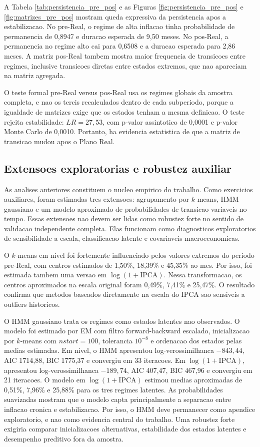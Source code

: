 A Tabela \ref{tab:persistencia_pre_pos} e as Figuras \ref{fig:persistencia_pre_pos} e \ref{fig:matrizes_pre_pos} mostram queda expressiva da persistencia apos a estabilizacao. No pre-Real, o regime de alta inflacao tinha probabilidade de permanencia de 0,8947 e duracao esperada de 9,50 meses. No pos-Real, a permanencia no regime alto cai para 0,6508 e a duracao esperada para 2,86 meses. A matriz pos-Real tambem mostra maior frequencia de transicoes entre regimes, inclusive transicoes diretas entre estados extremos, que nao apareciam na matriz agregada.

O teste formal pre-Real versus pos-Real usa os regimes globais da amostra completa, e nao os tercis recalculados dentro de cada subperiodo, porque a igualdade de matrizes exige que os estados tenham a mesma definicao. O teste rejeita estabilidade: \(LR=27,53\), com p-valor assintotico de 0,0001 e p-valor Monte Carlo de 0,0010. Portanto, ha evidencia estatistica de que a matriz de transicao mudou apos o Plano Real.

\subsection{Extensoes exploratorias e robustez auxiliar}

As analises anteriores constituem o nucleo empirico do trabalho. Como exercicios auxiliares, foram estimadas tres extensoes: agrupamento por \(k\)-means, HMM gaussiano e um modelo aproximado de probabilidades de transicao variaveis no tempo. Essas extensoes nao devem ser lidas como robustez forte no sentido de validacao independente completa. Elas funcionam como diagnosticos exploratorios de sensibilidade a escala, classificacao latente e covariaveis macroeconomicas.

O \(k\)-means em nivel foi fortemente influenciado pelos valores extremos do periodo pre-Real, com centros estimados de 1,50\%, 18,39\% e 45,35\% ao mes. Por isso, foi estimada tambem uma versao em \(\log(1+\text{IPCA})\). Nessa transformacao, os centros aproximados na escala original foram 0,49\%, 7,41\% e 25,47\%. O resultado confirma que metodos baseados diretamente na escala do IPCA sao sensiveis a outliers historicos.

O HMM gaussiano trata os regimes como estados latentes nao observados. O modelo foi estimado por EM com filtro forward-backward escalado, inicializacao por \(k\)-means com \(nstart=100\), tolerancia \(10^{-8}\) e ordenacao dos estados pelas medias estimadas. Em nivel, o HMM apresentou log-verossimilhanca \(-843,44\), AIC 1714,88, BIC 1775,37 e convergiu em 33 iteracoes. Em \(\log(1+\text{IPCA})\), apresentou log-verossimilhanca \(-189,74\), AIC 407,47, BIC 467,96 e convergiu em 21 iteracoes. O modelo em \(\log(1+\text{IPCA})\) estimou medias aproximadas de 0,51\%, 7,96\% e 25,88\% para os tres regimes latentes. As probabilidades suavizadas mostram que o modelo capta principalmente a separacao entre inflacao cronica e estabilizacao. Por isso, o HMM deve permanecer como apendice exploratorio, e nao como evidencia central do trabalho. Uma robustez forte exigiria comparar inicializacoes alternativas, estabilidade dos estados latentes e desempenho preditivo fora da amostra.

